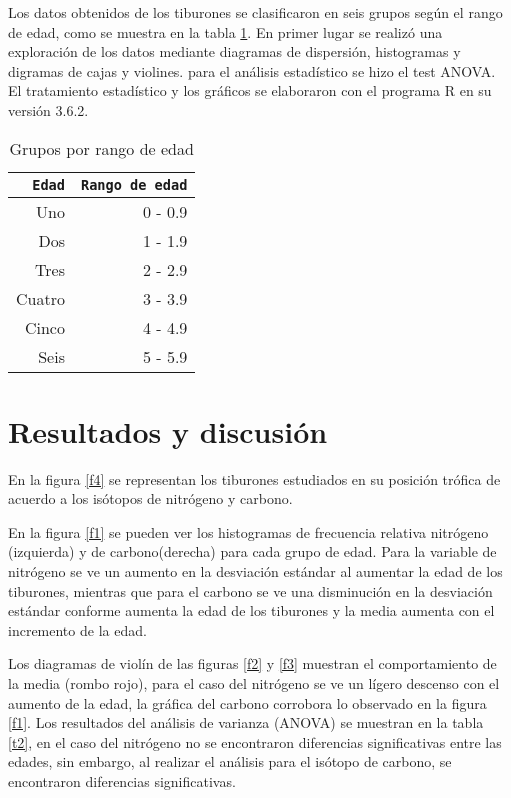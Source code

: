 \documentclass[12pt, letterpaper] {article}
\begin{document}
Los datos obtenidos de los tiburones se clasificaron en seis grupos seg\'un el rango de edad, como se muestra en la tabla \ref{t1}. En primer lugar se realiz\'o una exploraci\'on de los datos mediante diagramas de dispersi\'on, histogramas y digramas de cajas y violines.  para el an\'alisis estad\'istico se hizo el test ANOVA.  El tratamiento estad\'istico y los gr\'aficos se elaboraron con el programa R en su versi\'on 3.6.2.


\begin{table} 
 \caption{Grupos por rango de edad}
 \label{t1}
 \begin{center}
 \begin{tabular}{|r|r|}
\hline
\texttt{Edad} & \texttt{Rango de edad}  \\
\hline
Uno & 0 - 0.9 \\     
\hline
Dos & 1 - 1.9 \\    
\hline
Tres & 2 - 2.9 \\    
\hline
Cuatro & 3 - 3.9 \\    
\hline
Cinco & 4 - 4.9 \\    
\hline
Seis & 5 - 5.9 \\    
\hline
\end{tabular}
\end{center}
\end{table}





 
\section{Resultados y discusión}

En la figura \ref{f4} se representan los tiburones estudiados en su posici\'on tr\'ofica de acuerdo a los is\'otopos de nitr\'ogeno y carbono.

En la figura \ref{f1} se pueden ver los histogramas de frecuencia relativa nitr\'ogeno (izquierda) y de carbono(derecha) para cada grupo de edad.  Para la variable de nitrógeno se ve un aumento en la desviaci\'on est\'andar al aumentar la edad de los tiburones, mientras que para el carbono se ve una disminuci\'on en la desviaci\'on est\'andar conforme aumenta la edad de los tiburones y la media aumenta con el incremento de la edad. 

Los diagramas de violín de las figuras \ref{f2} y \ref{f3} muestran el comportamiento de la media (rombo rojo), para el caso del nitr\'ogeno se ve un l\'igero descenso con el aumento de la edad, la gr\'afica del carbono corrobora lo observado en la figura \ref{f1}.
Los resultados del an\'alisis de varianza (ANOVA) se muestran en la tabla \ref{t2}, en el caso del nitr\'ogeno no se encontraron diferencias significativas entre las edades, sin embargo, al realizar el an\'alisis para el is\'otopo de carbono, se encontraron diferencias significativas.
\end{document}

